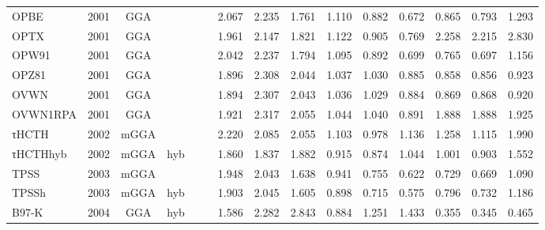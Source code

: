 \begin{landscape}
\begin{longtable}{lcccccrrrrrrrrr}
    OPBE             & 2001 & GGA  &          &             &           & 2.067             & 2.235             & 1.761  & 1.110              & 0.882             & 0.672  & 0.865   & 0.793 & 1.293 \\
    OPTX             & 2001 & GGA  &          &             &           & 1.961             & 2.147             & 1.821  & 1.122              & 0.905             & 0.769  & 2.258   & 2.215 & 2.830 \\
    OPW91            & 2001 & GGA  &          &             &           & 2.042             & 2.237             & 1.794  & 1.095              & 0.892             & 0.699  & 0.765   & 0.697 & 1.156 \\
    OPZ81            & 2001 & GGA  &          &             &           & 1.896             & 2.308             & 2.044  & 1.037              & 1.030             & 0.885  & 0.858   & 0.856 & 0.923 \\
    OVWN             & 2001 & GGA  &          &             &           & 1.894             & 2.307             & 2.043  & 1.036              & 1.029             & 0.884  & 0.869   & 0.868 & 0.920 \\
    OVWN1RPA         & 2001 & GGA  &          &             &           & 1.921             & 2.317             & 2.055  & 1.044              & 1.040             & 0.891  & 1.888   & 1.888 & 1.925 \\
    τHCTH            & 2002 & mGGA &          &             &           & 2.220             & 2.085             & 2.055  & 1.103              & 0.978             & 1.136  & 1.258   & 1.115 & 1.990 \\
    τHCTHhyb         & 2002 & mGGA & hyb      &             &           & 1.860             & 1.837             & 1.882  & 0.915              & 0.874             & 1.044  & 1.001   & 0.903 & 1.552 \\
    TPSS             & 2003 & mGGA &          &             &           & 1.948             & 2.043             & 1.638  & 0.941              & 0.755             & 0.622  & 0.729   & 0.669 & 1.090 \\
    TPSSh            & 2003 & mGGA & hyb      &             &           & 1.903             & 2.045             & 1.605  & 0.898              & 0.715             & 0.575  & 0.796   & 0.732 & 1.186 \\
    B97-K            & 2004 & GGA  & hyb      &             &           & 1.586             & 2.282             & 2.843  & 0.884              & 1.251             & 1.433  & 0.355   & 0.345 & 0.465 \\

\end{longtable}
\end{landscape}

